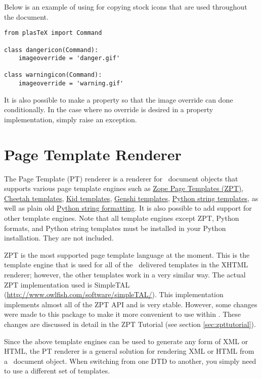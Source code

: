 Below is an example of using  for copying 
stock icons that are used throughout the document.
\begin{verbatim}
from plasTeX import Command

class dangericon(Command):
    imageoverride = 'danger.gif'

class warningicon(Command):
    imageoverride = 'warning.gif'
\end{verbatim}

It is also possible to make  a property
so that the image override can done conditionally.  In the case
where no override is desired in a property implementation, simply
raise an  exception.

\section{Page Template Renderer\label{sec:zpt}}

The Page Template (PT) renderer is a renderer for \plasTeX\ document
objects that supports various page template engines such as 
\href{http://www.zope.org/Documentation/Books/ZopeBook/2_6Edition/ZPT.stx}{Zope Page Templates (ZPT)}, 
\href{http://www.cheetahtemplate.org/}{Cheetah templates}, 
\href{http://kid-templating.org/}{Kid templates}, 
\href{http://genshi.edgewall.org/}{Genshi templates}, 
\href{http://docs.python.org/lib/node40.html}{Python string templates}, 
as well as plain old \href{http://docs.python.org/lib/typesseq-strings.html}{Python string formatting}.  It is also possible to add support for other 
template engines.  Note that all template engines except ZPT, Python formats, 
and Python string templates must be installed in your Python installation. 
They are not included.

ZPT is the most supported page template language at the moment.  This is the
template engine that is used for all of the \plasTeX\ delivered templates
in the XHTML renderer; however, the other templates work in a very similar way.
The actual ZPT implementation used is SimpleTAL 
(\url{http://www.owlfish.com/software/simpleTAL/}).  This implementation
implements almost all of the ZPT API and is very stable.  However, some
changes were made to this package to make it more convenient to use
within \plasTeX.  These changes are discussed in detail in the 
ZPT Tutorial (see section \ref{sec:zpttutorial}).

Since the above template engines can be used to generate any form of 
XML or HTML, the PT
renderer is a general solution for rendering XML or HTML from a 
\plasTeX\ document object.  When switching from one DTD to another, 
you simply need to use a different set of templates.

